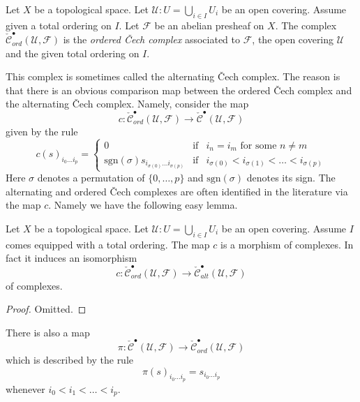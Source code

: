 \begin{definition}
\label{definition-ordered-cech-complex}
Let $X$ be a topological space.
Let $\mathcal{U} : U = \bigcup_{i \in I} U_i$ be an open covering.
Assume given a total ordering on $I$.
Let $\mathcal{F}$ be an abelian presheaf on $X$.
The complex $\check{\mathcal{C}}_{ord}^\bullet(\mathcal{U}, \mathcal{F})$
is the {\it ordered {\v C}ech complex} associated to $\mathcal{F}$, the
open covering $\mathcal{U}$ and the given total ordering on $I$.
\end{definition}

\noindent
This complex is sometimes called the alternating {\v C}ech complex.
The reason is that there is an obvious comparison map between
the ordered {\v C}ech complex and the alternating {\v C}ech complex.
Namely, consider the map
$$
c :
\check{\mathcal{C}}_{ord}^\bullet(\mathcal{U}, \mathcal{F})
\longrightarrow
\check{\mathcal{C}}^\bullet(\mathcal{U}, \mathcal{F})
$$
given by the rule
$$
c(s)_{i_0\ldots i_p} =
\left\{
\begin{matrix}
0 &
\text{if} &
i_n = i_m \text{ for some } n \not = m\\
\text{sgn}(\sigma) s_{i_{\sigma(0)}\ldots i_{\sigma(p)}} &
\text{if} &
i_{\sigma(0)} < i_{\sigma(1)} < \ldots < i_{\sigma(p)}
\end{matrix}
\right.
$$
Here $\sigma$ denotes a permutation of $\{0, \ldots, p\}$ and
$\text{sgn}(\sigma)$ denotes its sign. The alternating and ordered
{\v C}ech complexes are often identified in the literature via the map
$c$. Namely we have the following easy lemma.

\begin{lemma}
\label{lemma-ordered-alternating}
Let $X$ be a topological space.
Let $\mathcal{U} : U = \bigcup_{i \in I} U_i$ be an open covering.
Assume $I$ comes equipped with a total ordering.
The map $c$ is a morphism of complexes. In fact it induces
an isomorphism
$$
c : \check{\mathcal{C}}_{ord}^\bullet(\mathcal{U}, \mathcal{F})
\to \check{\mathcal{C}}_{alt}^\bullet(\mathcal{U}, \mathcal{F})
$$
of complexes.
\end{lemma}

\begin{proof}
Omitted.
\end{proof}

\noindent
There is also a map
$$
\pi :
\check{\mathcal{C}}^\bullet(\mathcal{U}, \mathcal{F})
\longrightarrow
\check{\mathcal{C}}_{ord}^\bullet(\mathcal{U}, \mathcal{F})
$$
which is described by the rule
$$
\pi(s)_{i_0\ldots i_p} = s_{i_0\ldots i_p}
$$
whenever $i_0 < i_1 < \ldots < i_p$.

